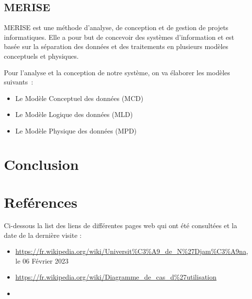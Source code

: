 \documentclass[12pt,a4paper]{article}
\begin{document}
	\subsection{MERISE}
	MERISE est une méthode d’analyse, de conception et de gestion de projets informatiques. Elle a pour but de concevoir des systèmes d’information et est basée sur la séparation des données et des traitements en plusieurs modèles conceptuels et physiques.
	
	Pour l’analyse et la conception de notre système, on va élaborer les modèles suivants :
	\begin{itemize}
		\item Le Modèle Conceptuel des données (MCD)
		\item Le Modèle Logique des données (MLD)
		\item Le Modèle Physique des données (MPD)
	\end{itemize}
	\newpage
	
	\section*{Conclusion}
	\newpage
	
	\section*{Reférences}
	Ci-dessous la list des liens de différentes pages web qui ont été consultées et la date de la dernière visite :
	\begin{itemize}
		\item \href{https://fr.wikipedia.org/wiki/Universit\%C3\%A9\_de\_N\%27Djam\%C3\%A9na}{https://fr.wikipedia.org/wiki/Universit\%C3\%A9\_de\_N\%27Djam\%C3\%A9na}, le 06 Février 2023
		\item \href{https://fr.wikipedia.org/wiki/Diagramme_de_cas_d\%27utilisation}{https://fr.wikipedia.org/wiki/Diagramme\_de\_cas\_d\%27utilisation}
		\item 
	\end{itemize}	
\end{document}
